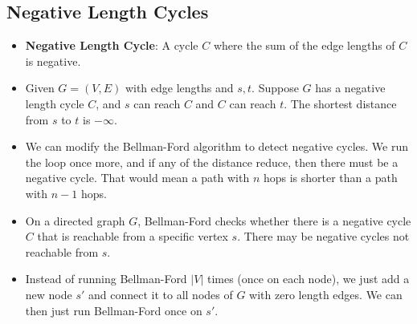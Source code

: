 \subsection{Negative Length Cycles}
\begin{itemize}
    \item \textbf{Negative Length Cycle}: A cycle $C$ where the sum of the edge lengths of $C$ is negative.
    \item Given $G = (V, E)$ with edge lengths and $s, t$. Suppose $G$ has a negative length cycle $C$, and $s$ can reach $C$ and $C$ can reach $t$. The shortest distance from $s$ to $t$ is $-\infty$.
    \item We can modify the Bellman-Ford algorithm to detect negative cycles. We run the loop once more, and if any of the distance reduce, then there must be a negative cycle. That would mean a path with $n$ hops is shorter than a path with $n - 1$ hops.
    
    \item On a directed graph $G$, Bellman-Ford checks whether there is a negative cycle $C$ that is reachable from a specific vertex $s$. There may be negative cycles not reachable from $s$.
    \item Instead of running Bellman-Ford $\left|V\right|$ times (once on each node), we just add a new node $s'$ and connect it to all nodes of $G$ with zero length edges. We can then just run Bellman-Ford once on $s'$.
\end{itemize}
